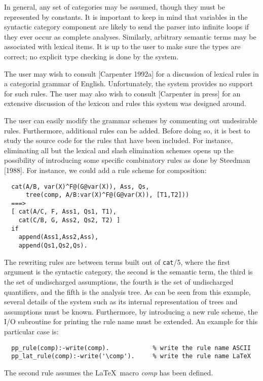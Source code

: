 In general, any set of categories may be assumed, though they must be
represented by constants.  It is important to keep in mind that
variables in the syntactic category component are likely to send the
parser into infinite loops if they ever occur as complete analyses. 
Similarly, arbitrary semantic terms may be associated with lexical
items.  It is up to the user to make sure the types are correct; no
explicit type checking is done by the system.

The user may wish to consult [Carpenter 1992a] for a discussion of
lexical rules in a categorial grammar of English.  Unfortunately, the
system provides no support for such rules.  The user may also wish to
consult [Carpenter in press] for an extensive discussion of the
lexicon and rules this system was designed around.




The user can easily modify the grammar schemes by commenting out
undesirable rules.  Furthermore, additional rules can be added.
Before doing so, it is best to study the source code for the rules
that have been included.  For instance, eliminating all but the
lexical and slash elimination schemes opens up the possibility of
introducing some specific combinatory rules as done by Steedman
[1988].  For instance, we could add a rule scheme for composition:
%
\begin{verbatim}
  cat(A/B, var(X)^F@(G@var(X)), Ass, Qs, 
      tree(comp, A/B:var(X)^F@(G@var(X)), [T1,T2]))
  ===>
  [ cat(A/C, F, Ass1, Qs1, T1),
    cat(C/B, G, Ass2, Qs2, T2) ]
  if
    append(Ass1,Ass2,Ass),
    append(Qs1,Qs2,Qs).
\end{verbatim}
%
The rewriting rules are between terms built out of {\tt cat}/5, where
the first argument is the syntactic category, the second is the
semantic term, the third is the set of undischarged assumptions, the
fourth is the set of undischarged quantifiers, and the fifth is the
analysis tree.  As can be seen from this example, several details of
the system such as its internal representation of trees and
assumptions must be known.  Furthermore, by introducing a new rule
scheme, the I/O subroutine for printing the rule name must be
extended.  An example for this particular case is:
%
\begin{verbatim}
  pp_rule(comp):-write(comp).            % write the rule name ASCII
  pp_lat_rule(comp):-write('\comp').     % write the rule name LaTeX
\end{verbatim}
%
The second rule assumes the \LaTeX\ macro {\it comp} has been defined.

